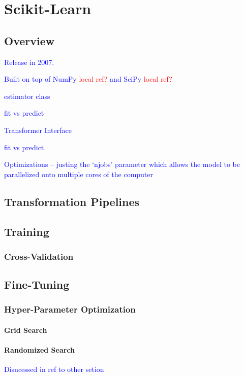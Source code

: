 \section{Scikit-Learn}

\subsection{Overview}

\textcolor{blue}{Release in 2007.}

\textcolor{blue}{Built on top of NumPy \textcolor{red}{local ref?} and SciPy \textcolor{red}{local ref?}}

\textcolor{blue}{estimator class}

\textcolor{blue}{fit vs predict}

\textcolor{blue}{Transformer Interface}

\textcolor{blue}{fit vs predict}

\textcolor{blue}{Optimizations -- justing the `njobs' parameter which allows the model to be parallelized onto multiple cores of the computer}


\subsection{Transformation Pipelines}

\subsection{Training}

\subsubsection{Cross-Validation}

\subsection{Fine-Tuning}

\subsubsection{Hyper-Parameter Optimization}

\paragraph{Grid Search}

\paragraph{Randomized Search}

\textcolor{blue}{Disucessed in ref to other setion}